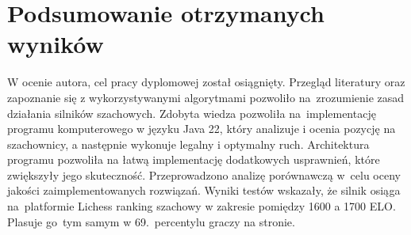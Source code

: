 \section {Podsumowanie otrzymanych wyników}
\label {sec: podsumowanie-pracy}

W ocenie autora, cel pracy dyplomowej został osiągnięty.
Przegląd literatury oraz zapoznanie się z wykorzystywanymi algorytmami pozwoliło na~zrozumienie zasad działania silników szachowych.
Zdobyta wiedza pozwoliła na~implementację programu komputerowego w języku Java 22, który analizuje i ocenia pozycję na szachownicy, a następnie wykonuje legalny i optymalny ruch.
Architektura programu pozwoliła na łatwą implementację dodatkowych usprawnień, które zwiększyły jego skuteczność.
Przeprowadzono analizę porównawczą w~celu oceny jakości zaimplementowanych rozwiązań.
Wyniki testów wskazały, że silnik osiąga na~platformie Lichess ranking szachowy w zakresie pomiędzy 1600 a 1700 ELO.
Plasuje go~tym samym w 69.\ percentylu graczy na stronie.